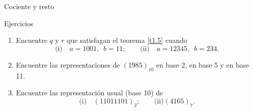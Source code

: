 \documentclass[11pt,spanish,makeidx]{amsbook}
\theoremstyle{definition}
\theoremstyle{remark}
\begin{document}
\begin{section}{Cociente y resto}
\begin{subsection}{Ejercicios}
\begin{enumerate}
\item Encuentre $q$ y $r$ que satisfagan el teorema \ref{t1.5} cuando
$$
\text{(i)}\quad a=1001,\,\,\, b=11; \qquad \text{(ii)}\quad
a=12345,\,\,\, b=234.
$$
\item Encuentre las representaciones de $(1985)_{10}$ en base 2, en base 5 y en base 11.
\item
 Encuentre las representación usual (base 10) de
$$
\text{(i)} \quad (11011101)_2; \qquad \text{(ii)} (4165)_7.
$$
\end{enumerate}
\end{subsection}
\end{section}
\end{document}
